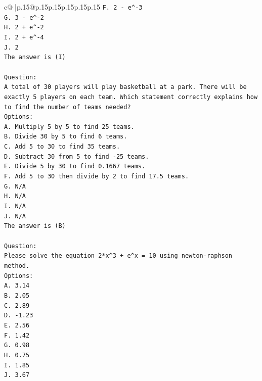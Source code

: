 \documentclass{article}
\begin{document}
{\begin{supertabular}{c@{$\;$}|p{.15\linewidth}@{}p{.15\linewidth}p{.15\linewidth}p{.15\linewidth}p{.15\linewidth}p{.15\linewidth}}
{{{\texttt{F. 2 {-} e\^{}{-}3} \\
\texttt{G. 3 {-} e\^{}{-}2} \\
\texttt{H. 2 + e\^{}{-}2} \\
\texttt{I. 2 + e\^{}{-}4} \\
\texttt{J. 2} \\
\texttt{The answer is (I)} \\
\\ 
\texttt{Question:} \\
\texttt{A total of 30 players will play basketball at a park. There will be exactly 5 players on each team. Which statement correctly explains how to find the number of teams needed?} \\
\texttt{Options:} \\
\texttt{A. Multiply 5 by 5 to find 25 teams.} \\
\texttt{B. Divide 30 by 5 to find 6 teams.} \\
\texttt{C. Add 5 to 30 to find 35 teams.} \\
\texttt{D. Subtract 30 from 5 to find {-}25 teams.} \\
\texttt{E. Divide 5 by 30 to find 0.1667 teams.} \\
\texttt{F. Add 5 to 30 then divide by 2 to find 17.5 teams.} \\
\texttt{G. N/A} \\
\texttt{H. N/A} \\
\texttt{I. N/A} \\
\texttt{J. N/A} \\
\texttt{The answer is (B)} \\
\\ 
\texttt{Question:} \\
\texttt{Please solve the equation 2*x\^{}3 + e\^{}x = 10 using newton{-}raphson method.} \\
\texttt{Options:} \\
\texttt{A. 3.14} \\
\texttt{B. 2.05} \\
\texttt{C. 2.89} \\
\texttt{D. {-}1.23} \\
\texttt{E. 2.56} \\
\texttt{F. 1.42} \\
\texttt{G. 0.98} \\
\texttt{H. 0.75} \\
\texttt{I. 1.85} \\
\texttt{J. 3.67} \\
            }
        }
    }
     \\ \\


\end{supertabular}}
\end{document}

